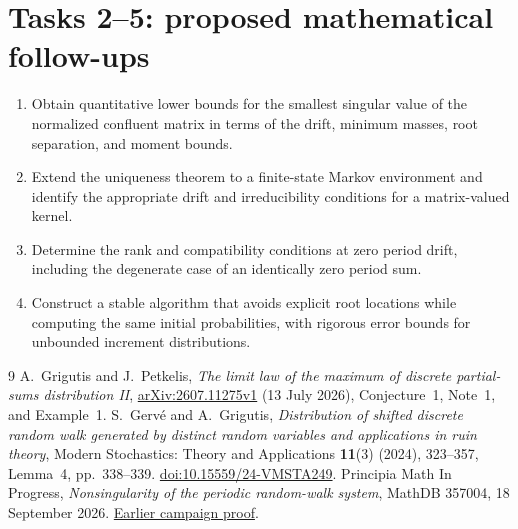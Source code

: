 \documentclass[11pt]{article}
\begin{document}
\section*{Tasks 2--5: proposed mathematical follow-ups}
\begin{enumerate}[label=\textbf{Task \arabic*:},start=2,leftmargin=*]
\item Obtain quantitative lower bounds for the smallest singular
value of the normalized confluent matrix in terms of the drift,
minimum masses, root separation, and moment bounds.
\item Extend the uniqueness theorem to a finite-state Markov
environment and identify the appropriate drift and irreducibility
conditions for a matrix-valued kernel.
\item Determine the rank and compatibility conditions at zero
period drift, including the degenerate case of an identically
zero period sum.
\item Construct a stable algorithm that avoids explicit root
locations while computing the same initial probabilities, with
rigorous error bounds for unbounded increment distributions.
\end{enumerate}

\begin{thebibliography}{9}
A.~Grigutis and J.~Petkelis, \emph{The limit law of the maximum
of discrete partial-sums distribution II},
\href{https://arxiv.org/abs/2607.11275}{arXiv:2607.11275v1}
(13 July 2026), Conjecture~1, Note~1, and Example~1.
S.~Gerv\'e and A.~Grigutis, \emph{Distribution of shifted discrete
random walk generated by distinct random variables and applications
in ruin theory}, Modern Stochastics: Theory and Applications
\textbf{11}(3) (2024), 323--357, Lemma~4, pp.~338--339.
\href{https://doi.org/10.15559/24-VMSTA249}{doi:10.15559/24-VMSTA249}.
Principia Math In Progress, \emph{Nonsingularity of the periodic
random-walk system}, MathDB 357004, 18 September 2026.
\href{https://github.com/antoshashakov/Principia-Math-In-Progress/blob/mathdb-results/mathdb-open-problems/problems/357004/solution.tex}{Earlier campaign proof}.
\end{thebibliography}
\end{document}
